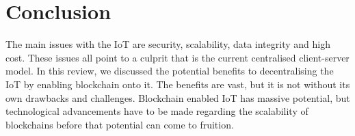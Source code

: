 \documentclass[transmag]{IEEEtran}
\begin{document}
\section{Conclusion}
The main issues with the IoT are security, scalability, data integrity and high cost. These issues all point to a culprit that is the current centralised client-server model. In this review, we discussed the potential benefits to decentralising the IoT by enabling blockchain onto it. The benefits are vast, but it is not without its own drawbacks and challenges. Blockchain enabled IoT has massive potential, but technological advancements have to be made regarding the scalability of blockchains before that potential can come to fruition.



\end{document}
